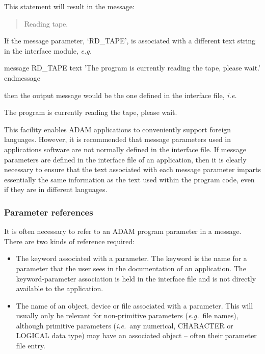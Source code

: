 \documentclass[twoside,11pt]{starlink}
\begin{document}
This statement will result in the message:

\begin {quote}
\begin {small}
\begin{terminalv}
Reading tape.
\end{terminalv}
\end {small}
\end {quote}

If the message parameter, `RD\_TAPE', is associated with a  different text
string in the interface module, \textit{e.g.}

\begin {small}
\begin{terminalv}
message RD_TAPE
   text 'The program is currently reading the tape, please wait.'
endmessage
\end{terminalv}
\end {small}

then the output message would be the one defined in the interface file, \emph{i.e.}

\begin {small}
\begin{terminalv}
The program is currently reading the tape, please wait.
\end{terminalv}
\end {small}

This facility enables ADAM applications to conveniently support foreign
languages.
However, it is recommended that message parameters used in applications
software are not normally defined in the interface file.
If message parameters are defined in the interface file of an application,
then it is clearly necessary to ensure that the text associated with each
message parameter imparts essentially the same information as the text used
within the program code, even if they are in different languages.


\subsubsection{Parameter references\label{parameter_references}}

It is often necessary to refer to an ADAM program parameter in a message.
There are two kinds of reference required:

\begin {itemize}
\item The keyword associated with a parameter.
The keyword is the name for a parameter that the user sees in the
documentation of an application.
The keyword-parameter association is held in the interface file and is
not directly available to the application.

\item The name of an object, device or file associated with a parameter.
This will usually only be relevant for non-primitive parameters
(\textit{e.g.}\ file names), although primitive parameters (\textit{i.e.}\ any
numerical, CHARACTER or LOGICAL data type) may have an associated object --
often their parameter file entry.
\end {itemize}
\end{document}
